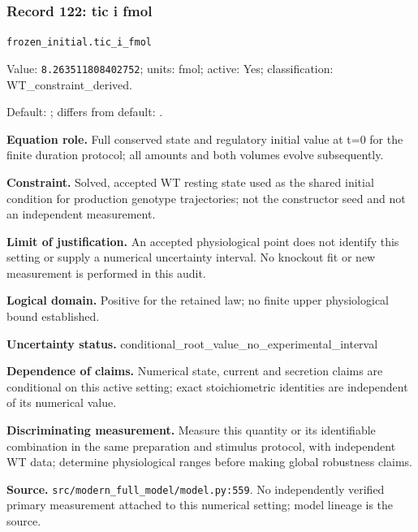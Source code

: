 \subsubsection*{Record 122: tic i fmol}
{\small \nolinkurl{frozen_initial.tic_i_fmol}\par

Value: \texttt{8.263511808402752}; units: fmol; active: Yes; classification: WT\_constraint\_derived.\par

Default: ; differs from default: .\par

\textbf{Equation role.} Full conserved state and regulatory initial value at t=0 for the finite duration protocol; all amounts and both volumes evolve subsequently.\par

\textbf{Constraint.} Solved, accepted WT resting state used as the shared initial condition for production genotype trajectories; not the constructor seed and not an independent measurement.\par

\textbf{Limit of justification.} An accepted physiological point does not identify this setting or supply a numerical uncertainty interval. No knockout fit or new measurement is performed in this audit.\par

\textbf{Logical domain.} Positive for the retained law; no finite upper physiological bound established.\par

\textbf{Uncertainty status.} conditional\_root\_value\_no\_experimental\_interval\par

\textbf{Dependence of claims.} Numerical state, current and secretion claims are conditional on this active setting; exact stoichiometric identities are independent of its numerical value.\par

\textbf{Discriminating measurement.} Measure this quantity or its identifiable combination in the same preparation and stimulus protocol, with independent WT data; determine physiological ranges before making global robustness claims.\par

\textbf{Source.} \nolinkurl{src/modern_full_model/model.py:559}. No independently verified primary measurement attached to this numerical setting; model lineage is the source.\par}


